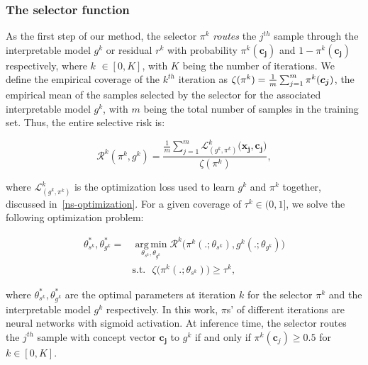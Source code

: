 \subsubsection{The selector function}
As the first step of our method, the selector $\pi^k$ \emph{routes} the $j^{th}$ sample through the interpretable model $g^k$ or residual $r^k$ with probability $\displaystyle \pi^k(\boldsymbol{c_j})$ and $\displaystyle 1 - \pi^k(\boldsymbol{c_j})$ respectively, where $k$ $\in [0,K]$, with $K$ being the number of iterations.
We define the empirical coverage of the $\displaystyle k^{th}$ iteration as $\vspace{-0.08pt} \zeta(\pi^k) = \frac{1}{m}\sum_{j = 1} ^ m \pi^k(\boldsymbol{c_j}) \vspace{-0.081pt}$, the empirical mean of the samples selected by the selector for the associated interpretable model $\displaystyle g^k$, with $\displaystyle m$ being the total number of samples in the training set. Thus, the entire selective risk is:

\begin{equation}
\label{equ: emp_risk}
\mathcal{R}^k(\displaystyle \pi^k, \displaystyle g^k) = \frac{\frac{1}{m}\sum_{j=1}^m\mathcal{L}_{(g^k, \pi^k)}^k\big(\boldsymbol{x_j}, \boldsymbol{c_j}\big)}{\zeta(\pi^k)} ,
\end{equation}

where $\mathcal{L}_{(g^k, \pi^k)}^k$ is the optimization loss used to learn $\displaystyle g^k$ and $\displaystyle \pi^k$ together, discussed in~\cref{ns-optimization}. For a given coverage of $\displaystyle \tau^k \in (0, 1]$, we solve the following optimization problem:

\vskip -7.5pt
\begin{align}
\label{equ: optimization_g}
\theta_{s^k}^*, \theta_{g^k}^* = & \operatorname*{arg\,min}_{\theta_{s^k}, \theta_{g^k}} \mathcal{R}^k\Big(\pi^k(.; \theta_{s^k}), \displaystyle g^k(.; \theta_{g^k}) \Big) \nonumber \\ 
&\text{s.t.} ~~~ \zeta\big(\pi^k(.; \theta_{s^k})\big) \geq \tau^k,
\end{align}
\vskip 2pt

where $\theta_{s^k}^*, \theta_{g^k}^*$ are the optimal parameters at iteration $k$ for the selector $\pi^k$ and the interpretable model $g^k$ respectively. In this work, $\pi$s' of different iterations are neural networks with sigmoid activation. At inference time, the selector routes the $j^{th}$ sample with concept vector $\boldsymbol{c_j}$ to $\displaystyle g^k$ if and only if $\pi^k(\boldsymbol{c}_j)\geq 0.5$ for $k \in [0,K]$.



